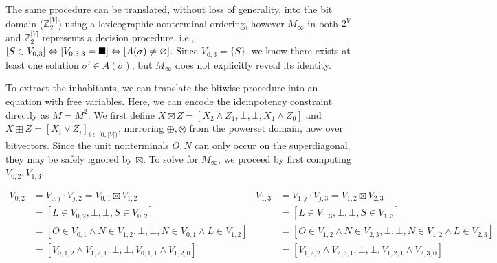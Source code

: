 \documentclass[sigplan,review,acmsmall,nonacm,screen,anonymous]{acmart}\settopmatter{printfolios=false,printccs=false,printacmref=false}
\begin{document}


\vspace{8pt}The same procedure can be translated, without loss of generality, into the bit domain ($\mathbb{Z}_2^{|V|}$) using a lexicographic nonterminal ordering, however $M_\infty$ in both $2^V$ and $\mathbb{Z}_2^{|V|}$ represents a decision procedure, i.e., $[S\in V_{0, 3}]\Leftrightarrow [V_{0, 3, 3}=\blacksquare] \Leftrightarrow [A(\sigma) \neq \varnothing]$. Since $V_{0, 3} = \{S\}$, we know there exists at least one solution $\sigma' \in A(\sigma)$, but $M_\infty$ does not explicitly reveal its identity.


To extract the inhabitants, we can translate the bitwise procedure into an equation with free variables. Here, we can encode the idempotency constraint directly as $M = M^2$. We first define $X \boxtimes Z = [X_2 \land Z_1, \bot, \bot, X_1 \land Z_0]$ and $X \boxplus Z = [X_i \lor Z_i]_{i \in [0, |V|)}$, mirroring $\oplus, \otimes$ from the powerset domain, now over bitvectors. Since the unit nonterminals $O, N$ can only occur on the superdiagonal, they may be safely ignored by $\boxtimes$. To solve for $M_\infty$, we proceed by first computing $V_{0, 2}, V_{1, 3}$:\vspace{-8pt}

\begin{small}
\begin{align*}
  V_{0, 2} &= V_{0, j} \cdot V_{j, 2} = V_{0, 1} \boxtimes V_{1, 2}                         &  V_{1, 3} &= V_{1, j} \cdot V_{j, 3} = V_{1, 2} \boxtimes V_{2, 3}\\
  &= [L \in V_{0, 2}, \bot, \bot, S \in V_{0, 2}]                                           &  &= [L \in V_{1, 3}, \bot, \bot, S \in V_{1, 3}]\\
  &= [O \in V_{0, 1} \land N \in V_{1, 2}, \bot, \bot, N \in V_{0, 1} \land L \in V_{1, 2}] &  &= [O \in V_{1, 2} \land N \in V_{2, 3}, \bot, \bot, N \in V_{1, 2} \land L \in V_{2, 3}]\\
  &= [V_{0, 1, 2} \land V_{1, 2, 1}, \bot, \bot, V_{0, 1, 1} \land V_{1, 2, 0}]             &  &= [V_{1, 2, 2} \land V_{2, 3, 1}, \bot, \bot, V_{1, 2, 1} \land V_{2, 3, 0}]
\end{align*}
\end{small}\vspace{-8pt}
\end{document}
